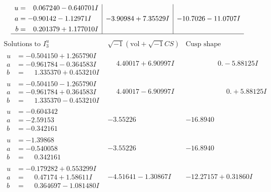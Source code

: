 \documentclass[1p]{elsarticle_modified}
\theoremstyle{definition}
\newcommand{\I}{\sqrt{-1}}
\begin{document}
$$\begin{array}{c|c|c}
\begin{aligned}
u &= \phantom{-}0.067240 - 0.640701 I \\
a &= -0.90142 - 1.12971 I \\
b &= \phantom{-}0.201379 + 1.177010 I\end{aligned}
 & -3.90984 + 7.35529 I & -10.7026 - 11.0707 I\\
 \hline 
 \end{array}$$\newpage$$\begin{array}{c|c|c}  
\text{Solutions to }I^u_{3}& \I (\text{vol} + \sqrt{-1}CS) & \text{Cusp shape}\\
 \hline 
\begin{aligned}
u &= -0.504150 + 1.265790 I \\
a &= -0.961784 - 0.364583 I \\
b &= \phantom{-}1.335370 + 0.453210 I\end{aligned}
 & \phantom{-}4.40017 + 6.90997 I & \phantom{-0.000000 } 0. - 5.88125 I \\ \hline\begin{aligned}
u &= -0.504150 - 1.265790 I \\
a &= -0.961784 + 0.364583 I \\
b &= \phantom{-}1.335370 - 0.453210 I\end{aligned}
 & \phantom{-}4.40017 - 6.90997 I & \phantom{-0.000000 -}0. + 5.88125 I \\ \hline\begin{aligned}
u &= -0.604342\phantom{ +0.000000I} \\
a &= -2.59153\phantom{ +0.000000I} \\
b &= -0.342161\phantom{ +0.000000I}\end{aligned}
 & -3.55226\phantom{ +0.000000I} & -16.8940\phantom{ +0.000000I} \\ \hline\begin{aligned}
u &= -1.39868\phantom{ +0.000000I} \\
a &= -0.540058\phantom{ +0.000000I} \\
b &= \phantom{-}0.342161\phantom{ +0.000000I}\end{aligned}
 & -3.55226\phantom{ +0.000000I} & -16.8940\phantom{ +0.000000I} \\ \hline\begin{aligned}
u &= -0.179282 + 0.553299 I \\
a &= \phantom{-}0.47174 + 1.58611 I \\
b &= \phantom{-}0.364697 - 1.081480 I\end{aligned}
 & -4.51641 - 1.30867 I & -12.27157 + 0.31860 I \\ \hline\begin{aligned}

\end{aligned}
\end{array}$$
\end{document}
